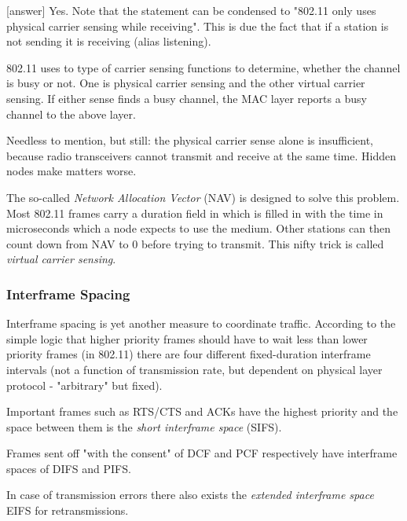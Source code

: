\documentclass{article}
\begin{document}
	\bigskip
	
	\color{red}
	[answer] Yes. Note that the statement can be condensed to "802.11 only uses physical carrier sensing while receiving". This is due the fact that if a station is not sending it is receiving (alias listening).
	\color{black}
	
	\bigskip
	
	802.11 uses to type of carrier sensing functions to determine, whether the channel is busy or not. One is physical carrier sensing and the other virtual carrier sensing. If either sense finds a busy channel, the MAC layer reports a busy channel to the above layer.
	
	\bigskip
	
	Needless to mention, but still: the physical carrier sense alone is insufficient, because radio transceivers cannot transmit and receive at the same time. Hidden nodes make matters worse.
	
	\bigskip
	
	The so-called \emph{Network Allocation Vector} (NAV) is designed to solve this problem. Most 802.11 frames carry a duration field in which is filled in with the time in microseconds which a node expects to use the medium. Other stations can then count down from NAV to 0 before trying to transmit. This nifty trick is called \emph{virtual carrier sensing}.
	
	\subsubsection{Interframe Spacing}
	
	Interframe spacing is yet another measure to coordinate traffic. According to the simple logic that higher priority frames should have to wait less than lower priority frames  (in 802.11) there are four different fixed-duration interframe intervals (not a function of transmission rate, but dependent on physical layer protocol - "arbitrary" but fixed).
	
	\bigskip
	
	Important frames such as RTS/CTS and ACKs have the highest priority and the space between them is the \emph{short interframe space} (SIFS).
	
	\medskip
	
	Frames sent off "with the consent" of DCF and PCF respectively have interframe spaces of DIFS and PIFS.
	
	\medskip
	
	In case of transmission errors there also exists the \emph{extended interframe space} EIFS for retransmissions. 
	
\end{document}
